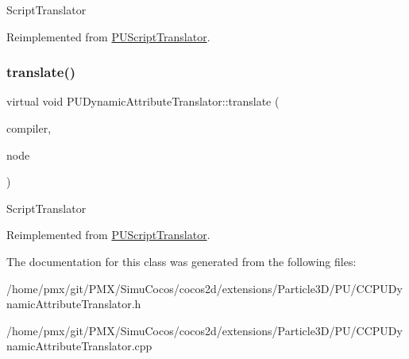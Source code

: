 Script\+Translator 

Reimplemented from \hyperlink{classPUScriptTranslator_a9ff2cdfda9ea8db6fd716e7b69dbe79b}{P\+U\+Script\+Translator}.

\mbox{\label{classPUDynamicAttributeTranslator_abb0555d08c17bfd5fbd10584d7851d1b}} 
\subsubsection{\texorpdfstring{translate()}{translate()}\hspace{0.1cm}{\footnotesize\ttfamily [2/2]}}
{\footnotesize\ttfamily virtual void P\+U\+Dynamic\+Attribute\+Translator\+::translate (\begin{DoxyParamCaption}\item[{\hyperlink{classPUScriptCompiler}{P\+U\+Script\+Compiler} $\ast$}]{compiler,  }\item[{\hyperlink{classPUAbstractNode}{P\+U\+Abstract\+Node} $\ast$}]{node }\end{DoxyParamCaption})\hspace{0.3cm}{\ttfamily [virtual]}}

Script\+Translator 

Reimplemented from \hyperlink{classPUScriptTranslator_a9ff2cdfda9ea8db6fd716e7b69dbe79b}{P\+U\+Script\+Translator}.



The documentation for this class was generated from the following files\+:\begin{DoxyCompactItemize}
\item 
/home/pmx/git/\+P\+M\+X/\+Simu\+Cocos/cocos2d/extensions/\+Particle3\+D/\+P\+U/C\+C\+P\+U\+Dynamic\+Attribute\+Translator.\+h\item 
/home/pmx/git/\+P\+M\+X/\+Simu\+Cocos/cocos2d/extensions/\+Particle3\+D/\+P\+U/C\+C\+P\+U\+Dynamic\+Attribute\+Translator.\+cpp\end{DoxyCompactItemize}
